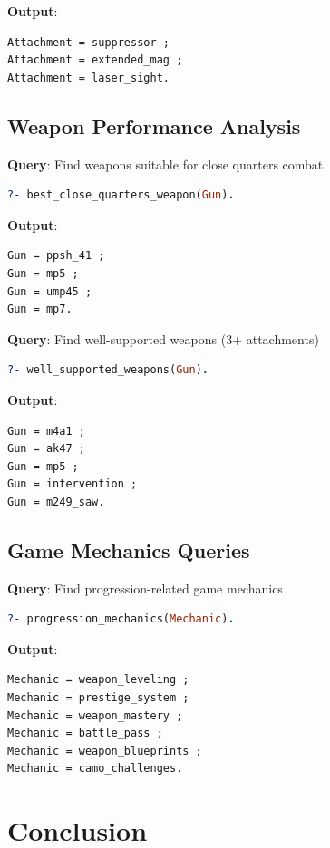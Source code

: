 \documentclass[12pt,a4paper]{article}
\begin{document}
\textbf{Output}:
\begin{lstlisting}
Attachment = suppressor ;
Attachment = extended_mag ;
Attachment = laser_sight.
\end{lstlisting}

\subsection{Weapon Performance Analysis}

\textbf{Query}: Find weapons suitable for close quarters combat
\begin{lstlisting}[language=Prolog]
?- best_close_quarters_weapon(Gun).
\end{lstlisting}

\textbf{Output}:
\begin{lstlisting}
Gun = ppsh_41 ;
Gun = mp5 ;
Gun = ump45 ;
Gun = mp7.
\end{lstlisting}

\textbf{Query}: Find well-supported weapons (3+ attachments)
\begin{lstlisting}[language=Prolog]
?- well_supported_weapons(Gun).
\end{lstlisting}

\textbf{Output}:
\begin{lstlisting}
Gun = m4a1 ;
Gun = ak47 ;
Gun = mp5 ;
Gun = intervention ;
Gun = m249_saw.
\end{lstlisting}

\subsection{Game Mechanics Queries}

\textbf{Query}: Find progression-related game mechanics
\begin{lstlisting}[language=Prolog]
?- progression_mechanics(Mechanic).
\end{lstlisting}

\textbf{Output}:
\begin{lstlisting}
Mechanic = weapon_leveling ;
Mechanic = prestige_system ;
Mechanic = weapon_mastery ;
Mechanic = battle_pass ;
Mechanic = weapon_blueprints ;
Mechanic = camo_challenges.
\end{lstlisting}

\section{Conclusion}
\end{document}
